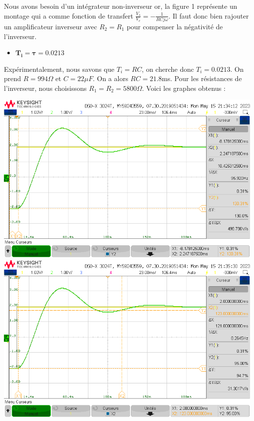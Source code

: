 \documentclass[12pt]{article}
\begin{document}
\normalsize Nous avons besoin d'un intégrateur non-inverseur or, la figure 1 représente un montage qui a comme fonction de transfert $\frac{V_s}{V_e} = -\frac{1}{RCj\omega}$. Il faut donc bien rajouter un amplificateur inverseur avec $R_2=R_1$ pour compenser la négativité de l'inverseur.
\begin{itemize}
    \item \large $\mathbf{T_i = \tau = 0.0213}$
\end{itemize}
Expérimentalement, nous savons que $T_i = RC$, on cherche donc $T_i = 0.0213$. On prend $R=994 \Omega$ et $C = 22 \mu F$. On a alors $RC = 21.8$ms.
Pour les résistances de l'inverseur, nous choisissons $R_1=R_2 = 5800 \Omega$. Voici les graphes obtenus : 

\begin{center}
    \includegraphics[width = 19 cm]{TP3/Syst_1/I/dep-syst1-ti=tau.png}
    \includegraphics[width = 19 cm]{TP3/Syst_1/I/tr5prc-syst1-ti=tau1.png}
\end{center}
\end{document}
